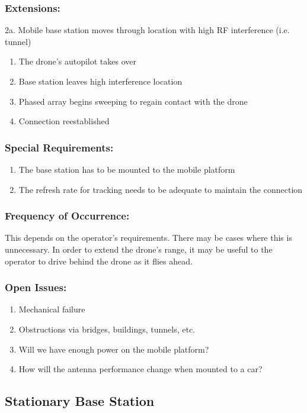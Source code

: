 \documentclass[ProductRequirements.tex]{subfiles}
\begin{document}
	\subsubsection*{Extensions:}
	2a. Mobile base station moves through location with high RF interference (i.e. tunnel)
	\begin{enumerate}
		\item The drone's autopilot takes over
		\item Base station leaves high interference location
		\item Phased array begins sweeping to regain contact with the drone
		\item Connection reestablished
	\end{enumerate}
	\subsubsection*{Special Requirements:}
	\begin{enumerate}\itemsep1pt
		\item The base station has to be mounted to the mobile platform
		\item The refresh rate for tracking needs to be adequate to maintain the connection
	\end{enumerate}
	\subsubsection*{Frequency of Occurrence:}
	This depends on the operator's requirements. There may be cases where this is unnecessary. In order to extend the drone's range, it may be useful to the operator to drive behind the drone as it flies ahead.
	\subsubsection*{Open Issues:}
	\begin{enumerate}\itemsep1pt
		\item Mechanical failure
		\item Obstructions via bridges, buildings, tunnels, etc.
		\item Will we have enough power on the mobile platform?
		\item How will the antenna performance change when mounted to a car?
	\end{enumerate}	
	
	\subsection{Stationary Base Station}
\end{document}
